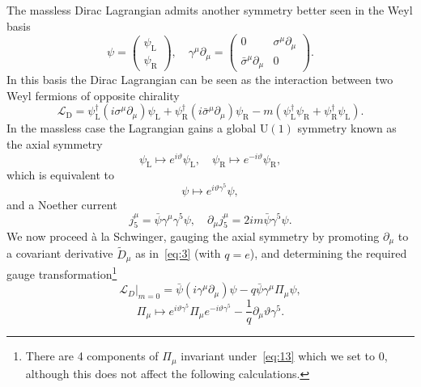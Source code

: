 \documentclass[11pt, a4paper]{article}
\begin{document}
The massless Dirac Lagrangian admits
another symmetry better seen in the Weyl basis
\begin{equation}
  \psi =
  \begin{pmatrix} \psi_\mathrm{L} \\ \psi_\mathrm{R} \end{pmatrix}, \quad
  \gamma^{\mu}\partial_\mu =
  \begin{pmatrix}0 & \sigma^\mu\partial_\mu \\ \bar{\sigma}^{\mu}\partial_\mu & 0 \end{pmatrix}.
\end{equation}
In this basis the Dirac Lagrangian can be seen as the interaction between two Weyl fermions
of opposite chirality~\cite{Weyl-tran}
\begin{equation}
  \mathcal{L}_\mathrm{D} = \psi_\mathrm{L}^{\dagger}(i\sigma^\mu\partial_\mu)\psi_\mathrm{L} +
  \psi_\mathrm{R}^{\dagger}(i\bar{\sigma}^\mu\partial_\mu)\psi_\mathrm{R}
  - m(\psi_\mathrm{L}^{\dagger}\psi_\mathrm{R} + \psi_\mathrm{R}^{\dagger}\psi_\mathrm{L}).
\end{equation}
In the massless case the Lagrangian gains a global $\mathrm{U}(1)$ symmetry
known as the axial symmetry
\begin{equation}
  \psi_\mathrm{L} \mapsto e^{i\vartheta}\psi_\mathrm{L}, \quad
  \psi_\mathrm{R} \mapsto e^{-i\vartheta}\psi_\mathrm{R},
\end{equation}
which is equivalent to 
\begin{equation}
  \psi \mapsto e^{i\vartheta\gamma^5}\psi,
\end{equation}
and a Noether current
\begin{equation}
  j^\mu_5 = \bar{\psi}\gamma^\mu\gamma^5\psi, \quad \partial_\mu j^\mu_5 = 2im\bar{\psi}\gamma^5\psi.
\end{equation}
We now proceed à la Schwinger, gauging the axial symmetry by promoting $\partial_\mu$
to a covariant derivative $\widetilde{D}_\mu$
as in~\eqref{eq:3} (with $q=e$), and determining the required
gauge transformation\footnote{There are 4 components
of $\Pi_\mu$ invariant under~\eqref{eq:13} which we set to 0,
although this does not affect the following calculations.}
\begin{equation}
  {\mathcal{L}_{D}|}_{m=0} = \bar{\psi}(i\gamma^\mu \partial_\mu)\psi
  - q\bar{\psi}\gamma^\mu\Pi_\mu\psi,
\end{equation}
\begin{equation}\label{eq:13}
  \Pi_\mu \mapsto e^{i\vartheta\gamma^5}\Pi_\mu e^{-i\vartheta\gamma^5} 
  - \frac{1}{q}\partial_\mu\vartheta\gamma^5.
\end{equation}
\end{document}
